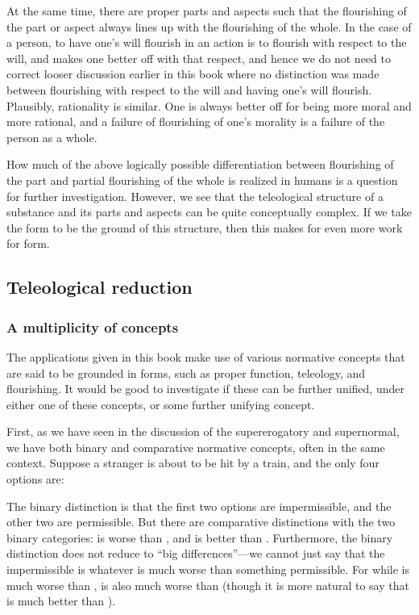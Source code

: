 At the same time, there are proper parts and aspects such that the flourishing of the part or aspect always lines up with the
flourishing of the whole. In the case of a person, to have one's will flourish in an action is to flourish with respect to the 
will, and makes one better off with that respect, and hence we do not need to correct looser discussion earlier in this book where
no distinction was made between flourishing with respect to the will and having one's will flourish. Plausibly, rationality is similar. 
One is always better off for being more moral and more rational, and a failure of flourishing of one's morality is a failure of the 
person as a whole. 

How much of the above logically possible differentiation between flourishing of the part and partial flourishing of the whole is 
realized in humans is a question for further investigation. However,
we see that the teleological structure of a substance and its parts and aspects can be quite conceptually complex. If we take
the form to be the ground of this structure, then this makes for even more work 
for form.

\subsection{Teleological reduction}
\subsubsection{A multiplicity of concepts}
The applications given in this book make use of various normative concepts that are said to be grounded in forms,
such as proper function, teleology, and flourishing. It would be good to investigate if these 
can be further unified, under either one of these concepts, or some further unifying concept.

First, as we have seen in the discussion of the supererogatory and supernormal, we have both binary and comparative normative 
concepts, often in the same context. Suppose a stranger is about to be hit by a train, and the only four options are:


The binary distinction is that
the first two options are impermissible, and the other two are permissible. But there are comparative distinctions
with the two binary categories:  is worse than , and  is better than . 
Furthermore, the binary distinction does 
not reduce to ``big differences''---we cannot just say that the impermissible is whatever is much worse than 
something permissible. For while  is much worse than ,  is also much worse than  (though 
it is more natural to say that  is much better than ). 

